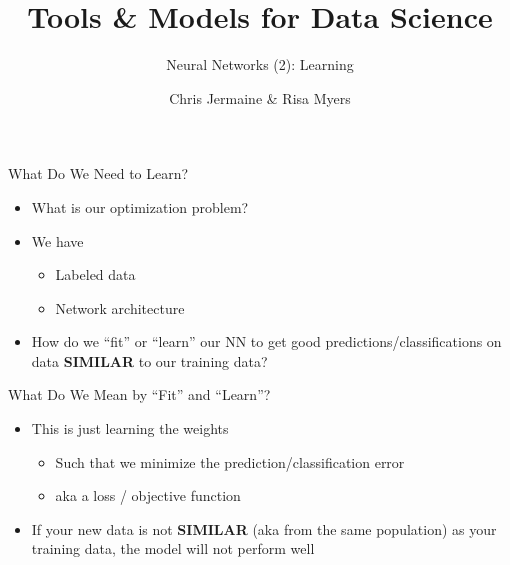\documentclass[aspectratio=169]{beamer}
\title[]
{ Tools \& Models for Data Science}
\subtitle{Neural Networks (2): Learning}
\author[]{Chris Jermaine \& Risa Myers}
\institute
{
  Rice University 
}
\date[]{}
\begin{document}
\begin{frame}
 \titlepage
\end{frame}
\begin{frame}{What Do We Need to Learn?}

\begin{itemize}
	\item What is our optimization problem?
	\item We have
	\begin{itemize}
	\item Labeled data
	\item Network architecture
	\end{itemize}
\item How do we ``fit'' or ``learn'' our NN to get good predictions/classifications on data \textbf{SIMILAR} to our training data?
\end{itemize}
\end{frame}
\begin{frame}{What Do We Mean by ``Fit'' and ``Learn''?}

\begin{itemize}
\item This is just learning the weights
	\begin{itemize}
	\item Such that we minimize the prediction/classification error
	\item aka a loss / objective function
	\end{itemize}
\item If your new data is not \textbf{SIMILAR} (aka from the same population) as your training data, the model will not perform well
\end{itemize}
\end{frame}
\end{document}
